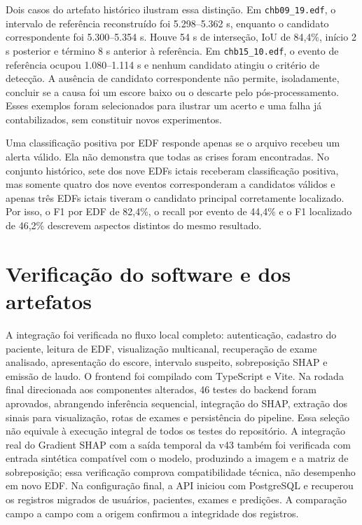 Dois casos do artefato histórico ilustram essa distinção. Em \texttt{chb09\_19.edf}, o intervalo de referência reconstruído foi 5.298--5.362 s, enquanto o candidato correspondente foi 5.300--5.354 s. Houve 54 s de interseção, IoU de 84,4\%, início 2 s posterior e término 8 s anterior à referência. Em \texttt{chb15\_10.edf}, o evento de referência ocupou 1.080--1.114 s e nenhum candidato atingiu o critério de detecção. A ausência de candidato correspondente não permite, isoladamente, concluir se a causa foi um escore baixo ou o descarte pelo pós-processamento. Esses exemplos foram selecionados para ilustrar um acerto e uma falha já contabilizados, sem constituir novos experimentos.

Uma classificação positiva por EDF responde apenas se o arquivo recebeu um alerta válido. Ela não demonstra que todas as crises foram encontradas. No conjunto histórico, sete dos nove EDFs ictais receberam classificação positiva, mas somente quatro dos nove eventos corresponderam a candidatos válidos e apenas três EDFs ictais tiveram o candidato principal corretamente localizado. Por isso, o F1 por EDF de 82,4\%, o recall por evento de 44,4\% e o F1 localizado de 46,2\% descrevem aspectos distintos do mesmo resultado.

\section{Verificação do software e dos artefatos}
A integração foi verificada no fluxo local completo: autenticação, cadastro do paciente, leitura de EDF, visualização multicanal, recuperação de exame analisado, apresentação do escore, intervalo suspeito, sobreposição SHAP e emissão de laudo. O frontend foi compilado com TypeScript e Vite. Na rodada final direcionada aos componentes alterados, 46 testes do backend foram aprovados, abrangendo inferência sequencial, integração do SHAP, extração dos sinais para visualização, rotas de exames e persistência do pipeline. Essa seleção não equivale à execução integral de todos os testes do repositório. A integração real do Gradient SHAP com a saída temporal da v43 também foi verificada com entrada sintética compatível com o modelo, produzindo a imagem e a matriz de sobreposição; essa verificação comprova compatibilidade técnica, não desempenho em novo EDF. Na configuração final, a API iniciou com PostgreSQL e recuperou os registros migrados de usuários, pacientes, exames e predições. A comparação campo a campo com a origem confirmou a integridade dos registros.

